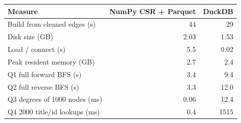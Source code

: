 \begin{tabular}{@{}lrr@{}}
\toprule
Measure & NumPy CSR + Parquet & DuckDB \\
\midrule
Build from cleaned edges (s) & 44 & 29 \\
Disk size (GB) & 2.03 & 1.53 \\
Load / connect (s) & 5.5 & 0.02 \\
Peak resident memory (GB) & 2.7 & 2.4 \\
Q1 full forward BFS (s) & 3.4 & 9.4 \\
Q2 full reverse BFS (s) & 3.3 & 12.0 \\
Q3 degrees of 1000 nodes (ms) & 0.06 & 12.4 \\
Q4 2000 title/id lookups (ms) & 0.4 & 1515 \\
\bottomrule
\end{tabular}
